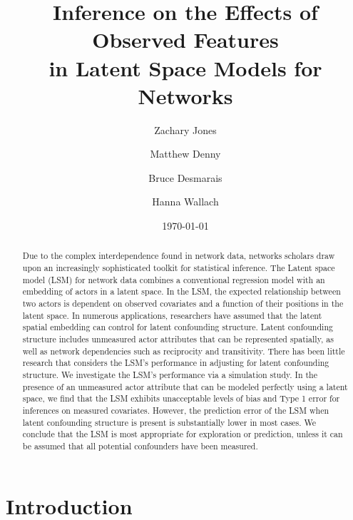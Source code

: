 \documentclass[11pt]{article}
\title{\vspace{-2cm} Inference on the Effects of Observed Features
\\ in Latent Space Models for Networks }
\author{ Zachary Jones \and Matthew Denny \and Bruce Desmarais \and Hanna Wallach} \date{\today}
\begin{document}
\maketitle




\begin{abstract}

\noindent Due to the complex interdependence found in network data,
networks scholars draw upon an increasingly sophisticated
toolkit for statistical inference. The Latent space model (LSM) for
network data combines a conventional regression model with an embedding of actors in a latent space. In the LSM, the expected relationship between two actors is dependent on observed covariates and a function of their positions in the latent space. In numerous applications, researchers have assumed
that the latent spatial embedding can control for latent
confounding structure. Latent confounding structure includes unmeasured actor attributes that can be represented spatially, as well as network dependencies such as reciprocity and transitivity. There has been little research that considers the LSM's
performance in adjusting for latent confounding structure. We investigate the
LSM's performance via a simulation study. In the presence of an
unmeasured actor attribute that can be modeled perfectly using a latent space,
we find that the LSM exhibits unacceptable levels of bias and Type 1 error for inferences on measured covariates. However, the prediction error of the LSM when latent confounding structure is present is substantially lower in most cases. We
conclude that the LSM is most appropriate for exploration or
prediction, unless it can be assumed that all potential confounders have been measured.
\end{abstract}
\thispagestyle{empty}
\section{Introduction}
\end{document}
